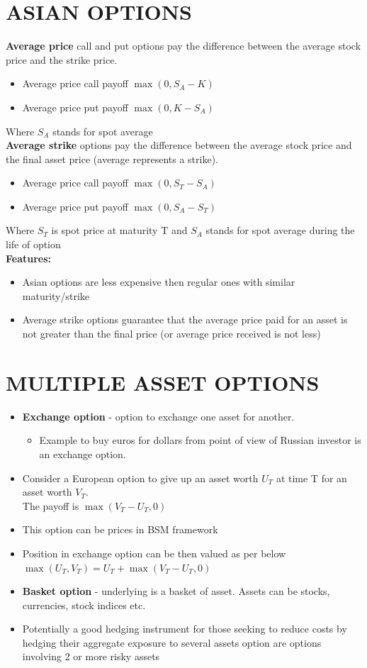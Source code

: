 \documentclass{article}
\begin{document}
\section{ASIAN OPTIONS}
{\bf Average price} call and put options pay the difference between the average stock price and the strike price.
\begin{itemize}
    \item Average price call payoff $\max(0, S_A - K)$
    \item Average price put payoff $\max(0, K - S_A)$
\end{itemize}
Where $S_A$ stands for spot average\\
{\bf Average strike} options pay the difference between the average stock price and the final asset price (average represents a strike).
\begin{itemize}
    \item Average price call payoff $\max(0, S_T - S_A)$
    \item Average price put payoff $\max(0, S_A - S_T)$
\end{itemize}
Where $S_T$ is spot price at maturity T and $S_A$ stands for spot average during the life of option\\
{\bf Features:} 
\begin{itemize}
    \item Asian options are less expensive then regular ones with similar maturity/strike 
    \item Average strike options guarantee that the average price paid for an asset is not greater than the final price (or average price received is not less)
\end{itemize}
\section{MULTIPLE ASSET OPTIONS}
\begin{itemize}
    \item {\bf Exchange option} - option to exchange one asset for another.
    \begin{itemize}
    \item Example to buy euros for dollars from point of view of Russian investor is an exchange option.
    \end{itemize}
    \item Consider a European option to give up an asset worth $U_T$ at time T for an asset worth $V_T$.\\
    The payoff is $\max(V_T - U_T, 0)$
    \item This option can be prices in BSM framework
    \item Position in exchange option can be then valued as per below\\
    $\max(U_T, V_T) = U_T + \max(V_T - U_T, 0)$
    \item {\bf Basket option} - underlying is a basket of asset. Assets can be stocks, currencies, stock indices etc.
    \item Potentially a good hedging instrument for those seeking to reduce costs by hedging their aggregate exposure to several assets
    \Rainbow option are options involving 2 or more risky assets
\end{itemize}
\end{document}
